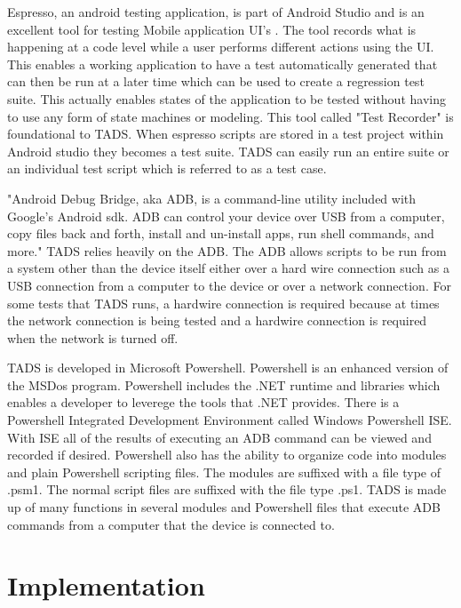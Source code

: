 Espresso, an android testing application, is part of Android Studio and is an excellent tool for testing Mobile application UI's \cite{nolan2015agile}.  The tool records what is happening at a code level while a user performs different actions using the UI.  This enables a working application to have a test automatically generated that can then be run at a later time which can be used to create a regression test suite.  This actually enables states of the application to be tested without having to use any form of state machines or modeling.  This tool called "Test Recorder" is foundational to TADS.  When espresso scripts are stored in a test project within Android studio they becomes a test suite.  TADS can easily run an entire suite or an individual test script which is referred to as a test case.

"Android Debug Bridge, aka ADB, is a command-line utility included with Google's Android sdk. ADB can control your device over USB from a computer, copy files back and forth, install and un-install apps, run shell commands, and more." \cite{hoffman2017}  TADS relies heavily on the ADB. The ADB allows scripts to be run from a system other than the device itself either over a hard wire connection such as a USB connection from a computer to the device or over a network connection.  For some tests that TADS runs, a hardwire connection is required because at times the network connection is being tested and a hardwire connection is required when the network is turned off.  

TADS is developed in Microsoft Powershell.  Powershell is an enhanced version of the MSDos program.  Powershell includes the .NET runtime and libraries which enables a developer to leverege the tools that .NET provides.  There is a Powershell Integrated Development Environment called Windows Powershell ISE.  With ISE all of the results of executing an ADB command can be viewed and recorded if desired.  Powershell also has the ability to organize code into modules and plain Powershell scripting files.  The modules are suffixed with a file type of .psm1.  The normal script files are suffixed with the file type .ps1.  TADS is made up of many functions in several modules and Powershell files that execute ADB commands from a computer that the device is connected to.   


\section{Implementation}

